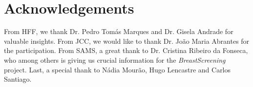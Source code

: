\section*{Acknowledgements}
\label{sec:sec009}

From HFF, we thank Dr. Pedro Tom\'{a}s Marques and Dr. Gisela Andrade for valuable insights.
From JCC, we would like to thank Dr. Jo\~{a}o Maria Abrantes for the participation.
From SAMS, a great thank to Dr. Cristina Ribeiro da Fonseca, who among others is giving us crucial information for the {\it BreastScreening} project.
Last, a special thank to N\'{a}dia Mour\~{a}o, Hugo Lencastre and Carlos Santiago.